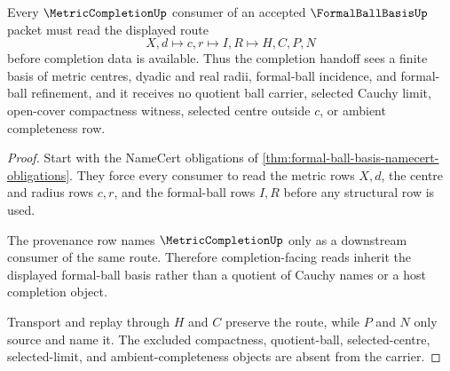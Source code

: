 \begin{theorem}
\label{thm:formal-ball-basis-metric-completion-handoff}
Every $\MetricCompletionUp$ consumer of an accepted $\FormalBallBasisUp$ packet must read the displayed route
$$
X,d \longmapsto c,r \longmapsto I,R \longmapsto H,C,P,N
$$
before completion data is available. Thus the completion handoff sees a finite basis of metric centres, dyadic and real radii, formal-ball incidence, and formal-ball refinement, and it receives no quotient ball carrier, selected Cauchy limit, open-cover compactness witness, selected centre outside $c$, or ambient completeness row.
\end{theorem}
\begin{proof}
Start with the NameCert obligations of \autoref{thm:formal-ball-basis-namecert-obligations}. They force every consumer to read the metric rows $X,d$, the centre and radius rows $c,r$, and the formal-ball rows $I,R$ before any structural row is used.

The provenance row names $\MetricCompletionUp$ only as a downstream consumer of the same route. Therefore completion-facing reads inherit the displayed formal-ball basis rather than a quotient of Cauchy names or a host completion object.

Transport and replay through $H$ and $C$ preserve the route, while $P$ and $N$ only source and name it. The excluded compactness, quotient-ball, selected-centre, selected-limit, and ambient-completeness objects are absent from the carrier.
\end{proof}

